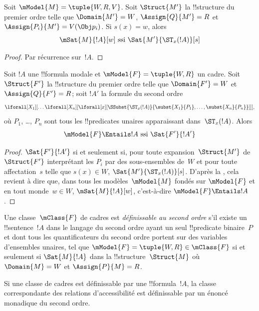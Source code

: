 \documentclass[../../../include/open-logic-section]{subfiles}
\begin{document}
\begin{prop}
  Soit $\mModel{M} = \tuple{W, R, V}$. Soit $\Struct{M'}$ la
  !!{structure} du premier ordre telle que $\Domain{M'} = W$,
  $\Assign{Q}{M'} = R$ et
  $\Assign{P_i}{M'} = V(\Obj p_i)$. Si $s(x) = w$, alors
  \[
  \mSat{M}{!A}[w] \text{ ssi } \Sat{M'}{\ST_x(!A)}[s]
  \]
\end{prop}

\begin{proof}
  Par récurrence sur~$!A$.
\end{proof}

\begin{prop}
  Soit $!A$ une !!{formula} modale et
  $\mModel{F} = \tuple{W, R}$ un cadre. Soit $\Struct{F'}$ la
  !!{structure} du premier ordre telle que
  $\Domain{F'} = W$ et $\Assign{Q}{F'} = R$; soit $!A'$ la formule
  du second ordre
  \[
  \lforall[X_1][\dots\lforall[X_n][\lforall[x][
        \SSubst{\ST_x(!A)}{\subst{X_1}{P_1}, \dots,
          \subst{X_n}{P_n}}]]],
  \]
  où $P_1$, \dots, $P_n$ sont tous les !!{predicate}s unaires
  apparaissant dans~$\ST_x(!A)$. Alors
  \[
  \mModel{F} \Entails !A \text{ ssi } \Sat{F'}{!A'}
  \]
\end{prop}

\begin{proof}
  $\Sat{F'}{!A'}$ si et seulement si, pour toute
  expansion~$\Struct{M'}$ de~$\Struct{F'}$ interprétant
  les $P_i$ par des sous-ensembles de~$W$ et pour
  toute affectation~$s$ telle que $s(x) \in W$,
  $\Sat{M'}{\ST_x(!A)}[s]$. D'après la , cela revient à
  dire que, dans tous les modèles~$\mModel{M}$ fondés sur
  $\mModel{F}$ et en tout monde~$w \in W$,
  $\mSat{M}{!A}[w]$, c'est-à-dire $\mModel{F} \Entails !A$.
\end{proof}

\begin{defn}
  Une classe~$\mClass{F}$ de cadres est \emph{définissable au second
  ordre} s'il existe un !!{sentence}~$!A$ dans le langage du second
  ordre ayant un seul !!{predicate} binaire~$P$ et dont tous les
  quantificateurs du second ordre portent sur des variables
  d'ensembles unaires, tel que
  $\mModel{F} = \tuple{W, R} \in \mClass{F}$ si et seulement si
  $\Sat{M}{!A}$ dans la !!{structure}~$\Struct{M}$ où
  $\Domain{M} = W$ et $\Assign{P}{M} = R$.
\end{defn}

\begin{cor}
  Si une classe de cadres est définissable par une
  !!{formula}~$!A$, la classe correspondante des relations
  d'accessibilité est définissable par un énoncé monadique du second
  ordre.
\end{cor}
\end{document}

